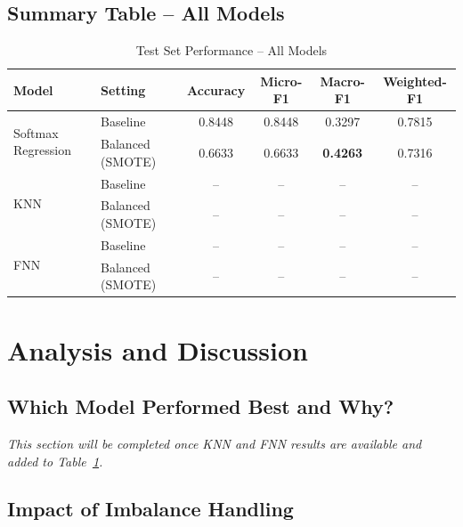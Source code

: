 \documentclass[12pt,a4paper]{article}
\begin{document}
\subsection{Summary Table -- All Models}

\begin{table}[H]
    \centering
    \caption{Test Set Performance -- All Models}
    \label{tab:summary}
    \begin{tabular}{llcccc}
        \toprule
        \textbf{Model} & \textbf{Setting} & \textbf{Accuracy} & \textbf{Micro-F1} & \textbf{Macro-F1} & \textbf{Weighted-F1} \\
        \midrule
        \multirow{2}{*}{Softmax Regression}
            & Baseline         & 0.8448 & 0.8448 & 0.3297          & 0.7815 \\
            & Balanced (SMOTE) & 0.6633 & 0.6633 & \textbf{0.4263} & 0.7316 \\
        \midrule
        \multirow{2}{*}{KNN}
            & Baseline         & --     & --     & --              & --     \\
            & Balanced (SMOTE) & --     & --     & --              & --     \\
        \midrule
        \multirow{2}{*}{FNN}
            & Baseline         & --     & --     & --              & --     \\
            & Balanced (SMOTE) & --     & --     & --              & --     \\
        \bottomrule
    \end{tabular}
\end{table}

\section{Analysis and Discussion}

\subsection{Which Model Performed Best and Why?}

\textit{This section will be completed once KNN and FNN results are available and added to Table~\ref{tab:summary}.}

\subsection{Impact of Imbalance Handling}
\end{document}
